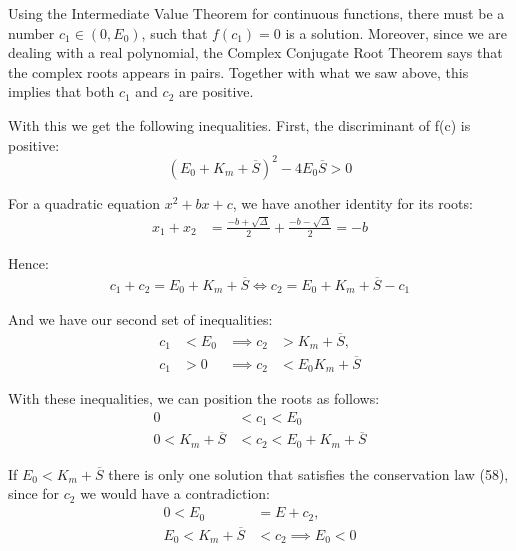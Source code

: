 \documentclass[12pt]{article}
\begin{document}
Using the Intermediate Value Theorem for continuous functions, there
must be a number $c_1 \in (0,E_0)$, such that $f(c_1) = 0$ is a
solution. Moreover, since we are dealing with a real polynomial, the
Complex Conjugate Root Theorem says that the complex roots appears in
pairs. Together with what we saw above, this implies that both $c_1$
and $c_2$ are positive.

With this we get the following inequalities. First, the discriminant
of f(c) is positive:
\begin{equation}
  (E_0 + K_m + \overline{S})^2 - 4 E_0 \overline{S} > 0
\end{equation}

For a quadratic equation $x^2 + bx + c$, we have another identity for
its roots:
\begin{align}
  x_1 + x_2 &= \frac{-b + \sqrt{\Delta}}{2} + \frac{-b - \sqrt{\Delta}}{2} = -b
\end{align}

Hence:
\begin{align}
  c_1 + c_2 = E_0 + K_m + \overline{S} \iff c_2 = E_0 + K_m + \overline{S} - c_1
\end{align}

And we have our second set of inequalities:
\begin{align}
  c_1 &< E_0 &\implies c_2 &> K_m + \overline{S}, \\
  c_1 &> 0 &\implies c_2 &< E_0 K_m + \overline{S}
\end{align}

With these inequalities, we can position the roots as follows:
\begin{align}
  0 &< c_1 < E_0 \\
  0 < K_m + \overline{S} &< c_2 < E_0 + K_m + \overline{S}
\end{align}

%
%

If $E_0 < K_m + \overline{S}$ there is only one solution that
satisfies the conservation law (58), since for $c_2$ we would have a
contradiction:
\begin{align}
  0 < E_0 &= E + c_2, \\
  E_0 < K_m + \overline{S} &< c_2 \implies E_0 < 0
\end{align}
\end{document}
